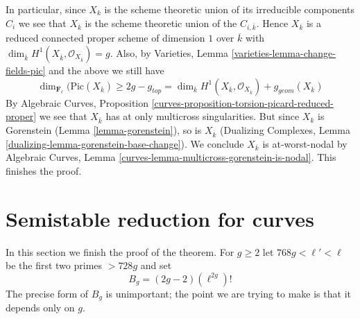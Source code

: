 \medskip\noindent
In particular, since $X_k$ is the scheme theoretic union of its
irreducible components $C_i$ we see that $X_{\overline{k}}$ is the
scheme theoretic union of the $C_{i, \overline{k}}$.
Hence $X_{\overline{k}}$ is a reduced connected proper
scheme of dimension $1$ over $\overline{k}$ with $\dim_{\overline{k}}
H^1(X_{\overline{k}}, \mathcal{O}_{X_{\overline{k}}}) = g$.
Also, by Varieties, Lemma \ref{varieties-lemma-change-fields-pic}
and the above we still have
$$
\dim_{\mathbf{F}_\ell}(\text{Pic}(X_{\overline{k}})
\geq 2g - g_{top} =
\dim_{\overline{k}} H^1(X_{\overline{k}}, \mathcal{O}_{X_{\overline{k}}})
+ g_{geom}(X_{\overline{k}})
$$
By Algebraic Curves, Proposition
\ref{curves-proposition-torsion-picard-reduced-proper}
we see that $X_{\overline{k}}$ has at only multicross singularities.
But since $X_k$ is Gorenstein (Lemma \ref{lemma-gorenstein}),
so is $X_{\overline{k}}$ (Dualizing Complexes, Lemma
\ref{dualizing-lemma-gorenstein-base-change}).
We conclude $X_{\overline{k}}$ is at-worst-nodal by
Algebraic Curves, Lemma \ref{curves-lemma-multicross-gorenstein-is-nodal}.
This finishes the proof.










\section{Semistable reduction for curves}
\label{section-semistable-reduction-theorem}

\noindent
In this section we finish the proof of the theorem.
For $g \geq 2$ let $768g < \ell' < \ell$
be the first two primes $> 728g$ and set
\begin{equation}
\label{equation-bound}
B_g = (2g - 2)(\ell^{2g})!
\end{equation}
The precise form of $B_g$ is unimportant; the point we are trying
to make is that it depends only on $g$.

